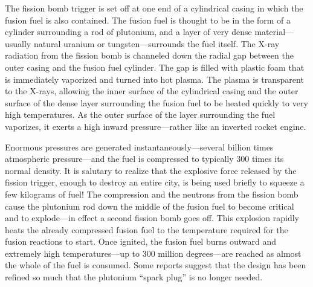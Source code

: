 \begin{multisolutionblock}
    
The fission bomb trigger is set off at one end of a cylindrical casing in
which the fusion fuel is also contained. The fusion fuel is thought to be in the form of a cylinder surrounding a rod of plutonium, and a layer of very dense material—usually natural uranium or tungsten—surrounds the fuel itself. The X-ray radiation from the fission bomb is channeled down the radial gap between the outer casing and the fusion fuel cylinder. The gap is filled with plastic foam that is immediately vaporized and turned into hot plasma. The plasma is transparent to the X-rays, allowing the inner surface of the cylindrical casing and the outer surface of the dense layer surrounding the fusion fuel to be heated quickly to very high temperatures. As the outer surface of the layer surrounding the fuel vaporizes, it exerts a high inward pressure—rather
like an inverted rocket engine.

Enormous pressures are generated instantaneously—several billion times
atmospheric pressure—and the fuel is compressed to typically 300 times its
normal density. It is salutary to realize that the explosive force released by the fission trigger, enough to destroy an entire city, is being used briefly to squeeze a few kilograms of fuel! The compression and the neutrons from the fission bomb cause the plutonium rod down the middle of the fusion fuel to become critical and to explode—in effect a second fission bomb goes off. This explosion rapidly heats the already compressed fusion fuel to the temperature required for the fusion reactions to start. Once ignited, the fusion fuel burns outward and extremely high temperatures—up to 300 million degrees—are reached as almost the whole of the fuel is consumed. Some reports suggest
that the design has been refined so much that the plutonium “spark plug” is no longer needed.
\end{multisolutionblock}

